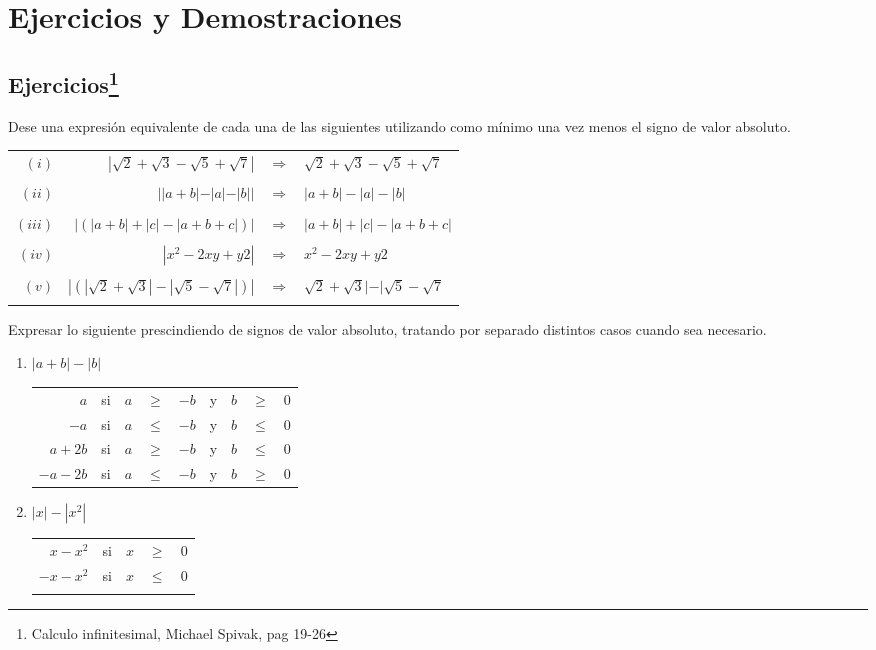\section{Ejercicios y Demostraciones}
\subsection[Ejercicios]{Ejercicios\footnote{Calculo infinitesimal, Michael Spivak, pag 19-26}}
\begin{ej}
Dese una expresión equivalente de cada una de las siguientes utilizando como mínimo una vez menos el signo de valor absoluto.\\
\begin{center}
\begin{tabular}{r r c l}
$(i)$&$|\sqrt{2}+\sqrt{3}-\sqrt{5}+\sqrt{7}|$&$\Rightarrow$&$\sqrt{2}+\sqrt{3}-\sqrt{5}+\sqrt{7}$\\\\
$(ii)$&$||a+b|-|a|-|b||$&$\Rightarrow$&$|a+b|-|a|-|b|$\\\\
$(iii)$&$|\left( |a+b|+|c|-|a+b+c| \right)|$&$\Rightarrow$&$|a+b|+|c|-|a+b+c|$\\\\
$(iv)$&$|x^2-2xy+y2|$&$\Rightarrow$&$x^2-2xy+y2$\\\\
$(v)$&$|\left(  |\sqrt{2}+ \sqrt{3}|-|\sqrt{5}-\sqrt{7}|  \right)|$&$\Rightarrow$&$\sqrt{2}+ \sqrt{3}|-|\sqrt{5}-\sqrt{7}$\\\\
\end{tabular}
\end{center}
\end{ej}

\begin{ej}
Expresar lo siguiente prescindiendo de signos de valor absoluto, tratando por separado distintos casos cuando sea necesario.
\begin{enumerate}[\bfseries (i)]
\item $|a+b|-|b|$
\begin{center}
\begin{tabular}{rcrclcrcl}
$a$&si&$a$&$\geq$&$-b$&y&$b$&$\geq$&$0$\\
$-a$&si&$a$&$\leq$&$-b$&y&$b$&$\leq$&$0$\\
$a+2b$&si&$a$&$\geq$&$-b$&y&$b$&$\leq$&$0$\\
$-a-2b$&si&$a$&$\leq$&$-b$&y&$b$&$\geq$&$0$\\
\end{tabular}
\end{center}
\item $|x|-|x^2|$
\begin{center}
\begin{tabular}{r c r c l}
$x-x^2$&si&$x$&$\geq$&$0$\\
$-x-x^2$&si&$x$&$\leq$&$0$\\\\
\end{tabular}
\end{center}
\end{enumerate}
\end{ej}

